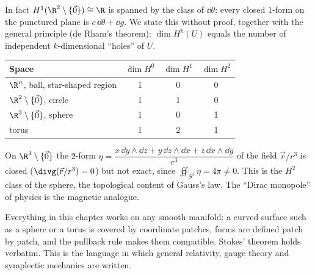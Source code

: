 In fact $H^1(\R^2\setminus\{\vec0\})\cong\R$ is spanned by the class of $\dd\theta$: every closed $1$-form on the punctured plane is $c\,\dd\theta+\dd g$. We state this without proof, together with the general principle (de Rham's theorem): $\dim H^k(U)$ equals the number of independent $k$-dimensional ``holes'' of $U$.

\begin{center}
\renewcommand{\arraystretch}{1.3}
\begin{tabular}{lccc}
\toprule
\textbf{Space} & $\dim H^0$ & $\dim H^1$ & $\dim H^2$ \\
\midrule
$\R^n$, ball, star-shaped region & 1 & 0 & 0 \\
$\R^2\setminus\{\vec0\}$, circle & 1 & 1 & 0 \\
$\R^3\setminus\{\vec0\}$, sphere & 1 & 0 & 1 \\
torus & 1 & 2 & 1 \\
\bottomrule
\end{tabular}
\end{center}

\begin{example}
On $\R^3\setminus\{\vec0\}$ the $2$-form $\eta=\dfrac{x\,\dd y\wedge\dd z+y\,\dd z\wedge\dd x+z\,\dd x\wedge\dd y}{r^3}$ of the field $\vec r/r^3$ is closed ($\divg(\vec r/r^3)=0$) but not exact, since $\oiint_{S^2}\eta=4\pi\ne0$. This is the $H^2$ class of the sphere, the topological content of Gauss's law. The ``Dirac monopole'' of physics is the magnetic analogue.
\end{example}

\begin{remark}[Beyond $\R^n$]
Everything in this chapter works on any smooth manifold: a curved surface such as a sphere or a torus is covered by coordinate patches, forms are defined patch by patch, and the pullback rule makes them compatible. Stokes' theorem holds verbatim. This is the language in which general relativity, gauge theory and symplectic mechanics are written.
\end{remark}

